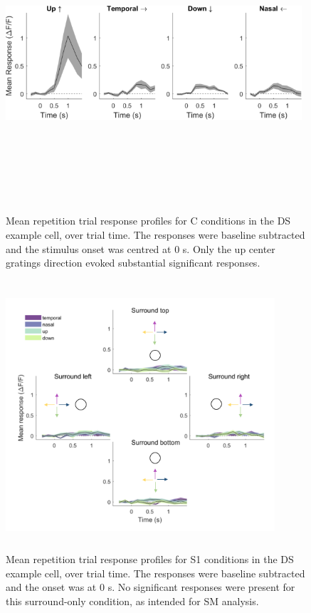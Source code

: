 \begin{figure}[H] \centering \includegraphics[width=11cm,height=11cm,keepaspectratio]{Figures/7.Results/individualSM/roi_29_mf379_pos5/1.png} 
\caption{Mean repetition trial response profiles for C conditions in the DS example cell, over trial time. The responses were baseline subtracted and the stimulus onset was centred at 0 s. Only the up center gratings direction evoked substantial significant responses.}
\label{DSexamplecellcenter}
\end{figure}

\begin{figure}[H] \centering \includegraphics[width=10cm,height=10cm,keepaspectratio]{Figures/7.Results/individualSM/roi_29_mf379_pos5/2.png} 
\caption{Mean repetition trial response profiles for S1 conditions in the DS example cell, over trial time. The responses were baseline subtracted and the onset was at 0 s. No significant responses were present for this surround-only condition, as intended for SM analysis.
\label{DSexamplecellsurrounds}}
\end{figure}

